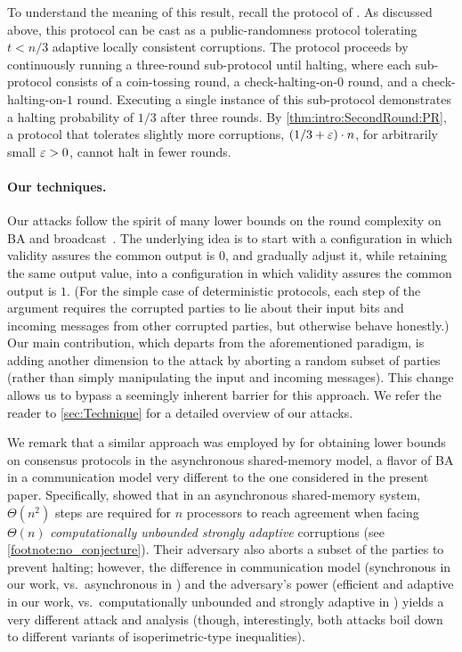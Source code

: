 To understand the meaning of this result, recall the protocol of \citet{Micali17}. As discussed above, this protocol can be cast as a public-randomness protocol tolerating $t<n/3$ adaptive locally consistent corruptions. The protocol proceeds by continuously running a three-round sub-protocol until halting, where each sub-protocol consists of a coin-tossing round, a check-halting-on-$0$ round, and a check-halting-on-$1$ round. Executing a single instance of this sub-protocol demonstrates a halting probability of $1/3$ after three rounds.
By \cref{thm:intro:SecondRound:PR}, a protocol that tolerates slightly more corruptions, \ie $(1/3 +\varepsilon) \cdot n$, for arbitrarily small $\varepsilon>0$, cannot halt in fewer rounds.


\paragraph{Our techniques.}
Our attacks follow the spirit of many lower bounds on the round complexity on BA and broadcast~\cite{FL82,DS83,KY86,DRS90,GKKO07,AH10}. The underlying idea is to start with a configuration in which validity assures the common output is $0$, and gradually adjust it, while retaining the same output value, into a configuration in which validity assures the common output is $1$. (For the simple case of deterministic protocols, each step of the argument requires the corrupted parties to lie about their input bits and incoming messages from other corrupted parties, but otherwise behave honestly.) Our main contribution, which departs from the aforementioned paradigm, is adding another dimension to the attack by aborting a random subset of parties (rather than simply manipulating the input and incoming messages). This change allows us to bypass a seemingly inherent barrier for this approach. We refer the reader to \cref{sec:Technique} for a detailed overview of our attacks.

We remark that a similar approach was employed by \citet{AC08} for obtaining lower bounds on consensus protocols in the asynchronous shared-memory model, a flavor of BA in a communication model very different to the one considered in the present paper. Specifically, \cite{AC08} showed that in an asynchronous shared-memory system, $\Theta(n^2)$ steps are required for $n$ processors to reach agreement when facing $\Theta(n)$ \emph{computationally unbounded strongly adaptive} corruptions (see \cref{footnote:no_conjecture}). Their adversary also aborts a subset of the parties to prevent halting; however, the difference in communication model (synchronous in our work, vs.\ asynchronous in \cite{AC08}) and the adversary's power (efficient and adaptive in our work, vs.\ computationally unbounded and strongly adaptive in \cite{AC08}) yields a very different attack and analysis (though, interestingly, both attacks boil down to different variants of isoperimetric-type inequalities).

